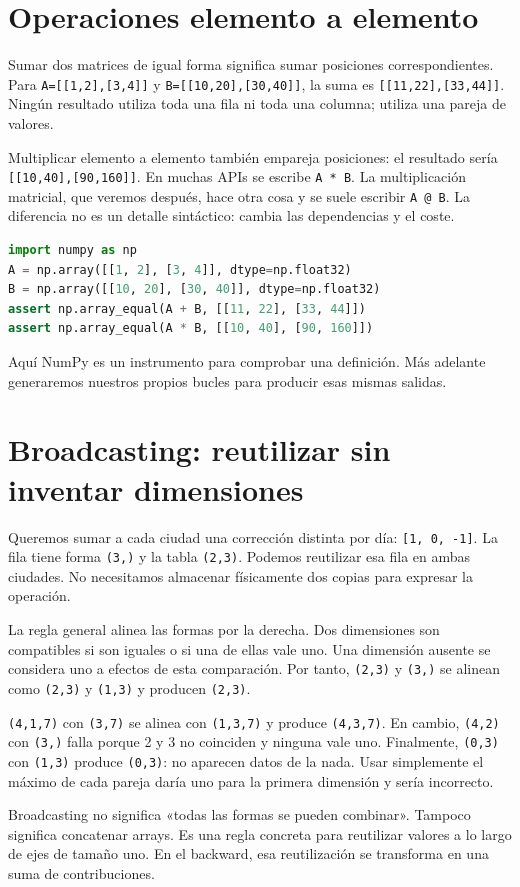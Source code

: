 \documentclass[12pt,a4paper,oneside]{report}
\begin{document}
\section{Operaciones elemento a elemento}
Sumar dos matrices de igual forma significa sumar posiciones correspondientes. Para \texttt{A=[[1,2],[3,4]]} y \texttt{B=[[10,20],[30,40]]}, la suma es \texttt{[[11,22],[33,44]]}. Ningún resultado utiliza toda una fila ni toda una columna; utiliza una pareja de valores.

Multiplicar elemento a elemento también empareja posiciones: el resultado sería \texttt{[[10,40],[90,160]]}. En muchas APIs se escribe \texttt{A * B}. La multiplicación matricial, que veremos después, hace otra cosa y se suele escribir \texttt{A @ B}. La diferencia no es un detalle sintáctico: cambia las dependencias y el coste.

\begin{lstlisting}[language=Python]
import numpy as np
A = np.array([[1, 2], [3, 4]], dtype=np.float32)
B = np.array([[10, 20], [30, 40]], dtype=np.float32)
assert np.array_equal(A + B, [[11, 22], [33, 44]])
assert np.array_equal(A * B, [[10, 40], [90, 160]])
\end{lstlisting}
Aquí NumPy es un instrumento para comprobar una definición. Más adelante generaremos nuestros propios bucles para producir esas mismas salidas.

\section{Broadcasting: reutilizar sin inventar dimensiones}
Queremos sumar a cada ciudad una corrección distinta por día: \texttt{[1, 0, -1]}. La fila tiene forma \texttt{(3,)} y la tabla \texttt{(2,3)}. Podemos reutilizar esa fila en ambas ciudades. No necesitamos almacenar físicamente dos copias para expresar la operación.

La regla general alinea las formas por la derecha. Dos dimensiones son compatibles si son iguales o si una de ellas vale uno. Una dimensión ausente se considera uno a efectos de esta comparación. Por tanto, \texttt{(2,3)} y \texttt{(3,)} se alinean como \texttt{(2,3)} y \texttt{(1,3)} y producen \texttt{(2,3)}.

\begin{ejemplo}
\texttt{(4,1,7)} con \texttt{(3,7)} se alinea con \texttt{(1,3,7)} y produce \texttt{(4,3,7)}. En cambio, \texttt{(4,2)} con \texttt{(3,)} falla porque 2 y 3 no coinciden y ninguna vale uno. Finalmente, \texttt{(0,3)} con \texttt{(1,3)} produce \texttt{(0,3)}: no aparecen datos de la nada. Usar simplemente el máximo de cada pareja daría uno para la primera dimensión y sería incorrecto.

\end{ejemplo}
Broadcasting no significa «todas las formas se pueden combinar». Tampoco significa concatenar arrays. Es una regla concreta para reutilizar valores a lo largo de ejes de tamaño uno. En el backward, esa reutilización se transforma en una suma de contribuciones.
\end{document}

